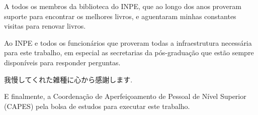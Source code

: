 \begin{agradecimentos}
A todos os membros da biblioteca do INPE, que ao longo dos anos proveram suporte para encontrar os melhores livros, e aguentaram minhas constantes visitas para renovar livros.

Ao INPE e todos os funcionários que proveram todas a infraestrutura necessária para este trabalho, em especial as secretarias da pós-graduação que estão sempre disponíveis para responder perguntas.

\begin{CJK}{UTF8}{min}
  我慢してくれた雑種に心から感謝します.
\end{CJK}

E finalmente, a Coordenação de Aperfeiçoamento de Pessoal de Nível Superior (CAPES) pela bolsa de estudos para executar este trabalho.

\end{agradecimentos}



